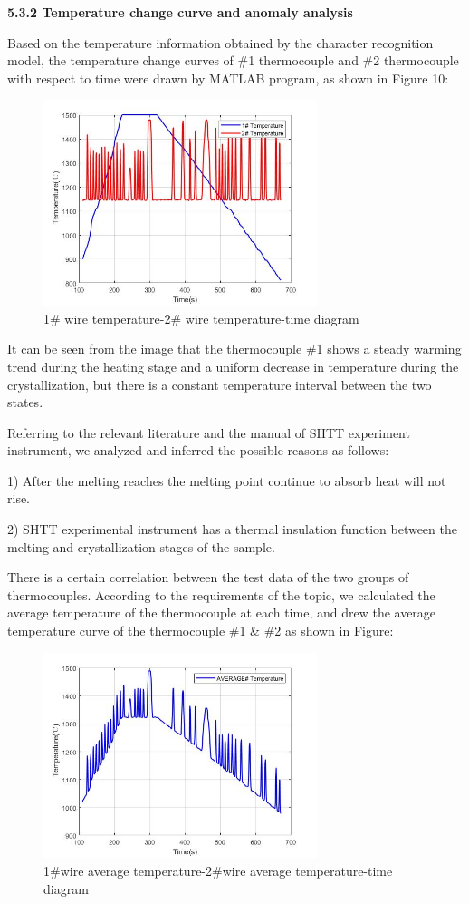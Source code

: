 \documentclass{apmcmthesis}
\begin{document}
	\noindent\textbf{5.3.2 Temperature change curve and anomaly analysis}
	
	Based on the temperature information obtained by the character recognition model, the temperature change curves of \#1 thermocouple and \#2 thermocouple with respect to time were drawn by MATLAB program, as shown in Figure 10:
	
	\begin{figure}
		\centering
		\includegraphics[height=6cm]{./figures/5-2.jpg}
		\caption{1\# wire temperature-2\# wire temperature-time diagram}
		\label{fig:8}
	\end{figure}
  
  	It can be seen from the image that the thermocouple \#1 shows a steady warming trend during the heating stage and a uniform decrease in temperature during the crystallization, but there is a constant temperature interval between the two states.
  	
  	Referring to the relevant literature and the manual of SHTT experiment instrument, we analyzed and inferred the possible reasons as follows: 
  	
  	1) After the melting reaches the melting point continue to absorb heat will not rise.
  	
  	2) SHTT experimental instrument has a thermal insulation function between the melting and crystallization stages of the sample.
  	
  	There is a certain correlation between the test data of the two groups of thermocouples. According to the requirements of the topic, we calculated the average temperature of the thermocouple at each time, and drew the average temperature curve of the thermocouple \#1 \& \#2 as shown in Figure:
\begin{figure}
	\centering
	\includegraphics[height=6cm]{./figures/5-3.jpg}
	\caption{1\#wire average temperature-2\#wire average temperature-time diagram}
	\label{fig:9}
\end{figure}
	
\end{document}
